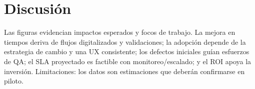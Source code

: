 \section{Discusión}
Las figuras evidencian impactos esperados y focos de trabajo. La mejora en tiempos deriva de flujos digitalizados y validaciones; la adopción depende de la estrategia de cambio y una UX consistente; los defectos iniciales guían esfuerzos de QA; el SLA proyectado es factible con monitoreo/escalado; y el ROI apoya la inversión. Limitaciones: los datos son estimaciones que deberán confirmarse en piloto.